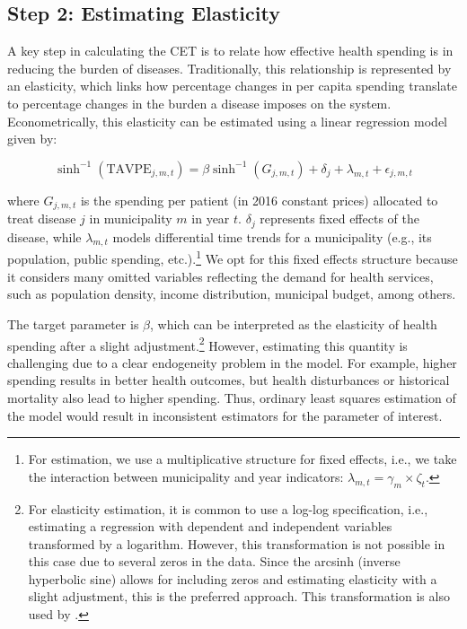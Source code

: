 \documentclass[11pt]{article}
\numberwithin{equation}{section}
\theoremstyle{remark}
\begin{document}
\subsection{Step 2: Estimating Elasticity}

A key step in calculating the CET is to relate how effective health spending is in reducing the burden of diseases. Traditionally, this relationship is represented by an elasticity, which links how percentage changes in per capita spending translate to percentage changes in the burden a disease imposes on the system. Econometrically, this elasticity can be estimated using a linear regression model given by:

\[\sinh^{-1}(\text{TAVPE}_{j,m,t})=\beta\sinh^{-1}(G_{j,m,t})+ \delta_{j}+\lambda_{m,t}+\epsilon_{j,m,t}\]

where $G_{j,m,t}$ is the spending per patient (in 2016 constant prices) allocated to treat disease $j$ in municipality $m$ in year $t$. $\delta_j$ represents fixed effects of the disease, while $\lambda_{m,t}$ models differential time trends for a municipality (e.g., its population, public spending, etc.).\footnote{For estimation, we use a multiplicative structure for fixed effects, i.e., we take the interaction between municipality and year indicators: $\lambda_{m,t}=\gamma_m\times \zeta_t$.} We opt for this fixed effects structure because it considers many omitted variables reflecting the demand for health services, such as population density, income distribution, municipal budget, among others.

The target parameter is $\beta$, which can be interpreted as the elasticity of health spending after a slight adjustment.\footnote{For elasticity estimation, it is common to use a log-log specification, i.e., estimating a regression with dependent and independent variables transformed by a logarithm. However, this transformation is not possible in this case due to several zeros in the data. Since the arcsinh (inverse hyperbolic sine) allows for including zeros and estimating elasticity with a slight adjustment, this is the preferred approach. This transformation is also used by \citet{Espinosa2021}.} However, estimating this quantity is challenging due to a clear endogeneity problem in the model. For example, higher spending results in better health outcomes, but health disturbances or historical mortality also lead to higher spending. Thus, ordinary least squares estimation of the model would result in inconsistent estimators for the parameter of interest.
\end{document}
